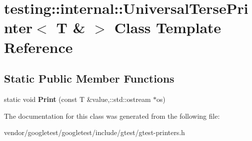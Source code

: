 \hypertarget{classtesting_1_1internal_1_1UniversalTersePrinter_3_01T_01_6_01_4}{}\section{testing\+:\+:internal\+:\+:Universal\+Terse\+Printer$<$ T \& $>$ Class Template Reference}
\label{classtesting_1_1internal_1_1UniversalTersePrinter_3_01T_01_6_01_4}
\subsection*{Static Public Member Functions}
\begin{DoxyCompactItemize}
\item 
static void {\bfseries Print} (const T \&value,\+::std\+::ostream $\ast$os)\hypertarget{classtesting_1_1internal_1_1UniversalTersePrinter_3_01T_01_6_01_4_a5f0d2e50bb18c00d019389fca869b9d0}{}\label{classtesting_1_1internal_1_1UniversalTersePrinter_3_01T_01_6_01_4_a5f0d2e50bb18c00d019389fca869b9d0}

\end{DoxyCompactItemize}


The documentation for this class was generated from the following file\+:\begin{DoxyCompactItemize}
\item 
vendor/googletest/googletest/include/gtest/gtest-\/printers.\+h\end{DoxyCompactItemize}
